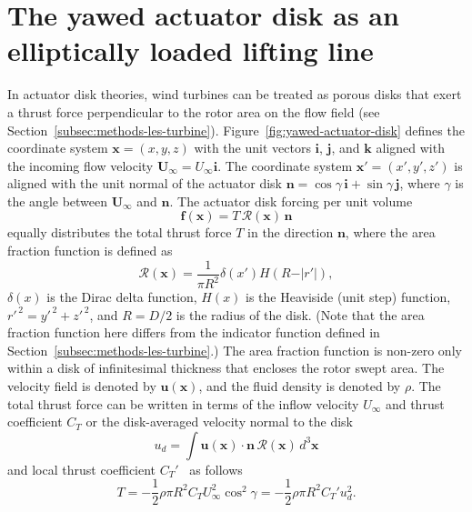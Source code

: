 \section{The yawed actuator disk as an elliptically loaded lifting line}
\label{sec:yaw-adm}
In actuator disk theories, wind turbines can be treated as porous disks that exert a thrust force perpendicular to the rotor area on the flow field (see Section~\ref{subsec:methods-les-turbine}). Figure~\ref{fig:yawed-actuator-disk} defines the  coordinate system $\mathbf{x} = (x,y,z)$ with the unit vectors $\boldsymbol{i}$, $\boldsymbol{j}$, and $\boldsymbol{k}$ aligned with the incoming flow velocity $\mathbf{U}_\infty = U_\infty \boldsymbol{i}$. The coordinate system $\mathbf{x}' = (x',y',z')$ is aligned with the unit normal of the actuator disk $\mathbf{n} = \cos \gamma \, \boldsymbol{i} + \sin \gamma \, \boldsymbol{j}$, where $\gamma$ is the angle between $\mathbf{U}_\infty$ and $\mathbf{n}$. The actuator disk forcing per unit volume 
\begin{equation}
\mathbf{f}(\mathbf{x}) = T \, \mathcal{R}(\mathbf{x}) \, \mathbf{n}
\end{equation}
equally distributes the total thrust force $T$ in the direction $\mathbf{n}$, where the area fraction function is defined as \begin{equation}
\mathcal{R}(\mathbf{x}) = \frac{1}{\pi R^2} \delta (x') H(R - \vert r' \vert),
\end{equation}
$\delta(x)$ is the Dirac delta function, $H(x)$ is the Heaviside (unit step) function, $r'^{\,2} = y'^{\,2} + z'^{\,2}$, and $R=D/2$ is the radius of the disk. (Note that the area fraction function here differs from the indicator function defined in Section~\ref{subsec:methods-les-turbine}.) The area fraction function is non-zero only within a disk of infinitesimal thickness that encloses the rotor swept area. The velocity field is denoted by $\mathbf{u}(\mathbf{x})$, and the fluid density is denoted by $\rho$. The total thrust force can be written in terms of the inflow velocity $U_\infty$ and thrust coefficient $C_T$ or the disk-averaged velocity normal to the disk 
\begin{equation}
u_d= \int \mathbf{u}(\mathbf{x}) \cdot \mathbf{n} \, \mathcal{R}(\mathbf{x}) \, d^3 \mathbf{x}
\end{equation}
and local thrust coefficient $C_T'$~\cite{Calaf2010a} as follows
\begin{equation}
\label{eq:thrust}
T = -\frac{1}{2} \rho \pi R^2  C_T U_\infty^2 \cos^2\gamma  = -\frac{1}{2} \rho \pi R^2 C_T' u_d^2.
\end{equation}

